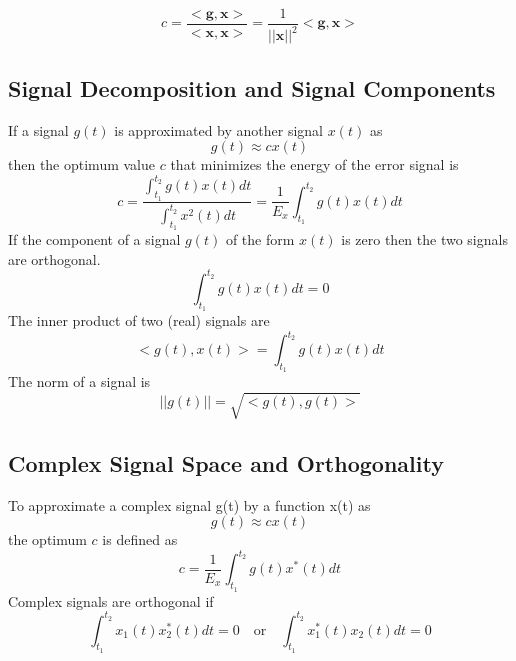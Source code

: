 \documentclass{article}
\begin{document}
    \begin{equation}
        c = \frac{<\textbf{g}, \textbf{x}>}{<\textbf{x}, \textbf{x}>} = \frac{1}{||\textbf{x}||^2}<\textbf{g}, \textbf{x}>
    \end{equation}

    \subsection{Signal Decomposition and Signal Components}
    If a signal $g(t)$ is approximated by another signal $x(t)$ as
    \begin{equation}
        g(t) \approx cx(t)
    \end{equation}
    then the optimum value $c$ that minimizes the energy of the error signal is
    \begin{equation}
        c = \frac{\int_{t_1}^{t_2}g(t)x(t)dt}{\int_{t_1}^{t_2}x^2(t)dt} = \frac{1}{E_x}\int_{t_1}^{t_2}g(t)x(t)dt
    \end{equation}
    If the component of a signal $g(t)$ of the form $x(t)$ is zero then the two signals are orthogonal. 
    \begin{equation}
        \int_{t_1}^{t_2}g(t)x(t)dt = 0
    \end{equation}
    The inner product of two (real) signals are
    \begin{equation}
        <g(t), x(t)> = \int_{t_1}^{t_2}g(t)x(t)dt
    \end{equation}
    The norm of a signal is
    \begin{equation}
        ||g(t)|| = \sqrt{<g(t), g(t)>}
    \end{equation}

    \subsection{Complex Signal Space and Orthogonality}
    To approximate a complex signal g(t) by a function x(t) as 
    \begin{equation}
        g(t) \approx cx(t)
    \end{equation}
    the optimum $c$ is defined as
    \begin{equation}
        c = \frac{1}{E_x}\int_{t_1}^{t_2}g(t)x^\ast(t)dt
    \end{equation}
    Complex signals are orthogonal if
    \begin{equation}
        \int_{t_1}^{t_2}x_1(t)x_2^\ast(t)dt = 0 \quad \textrm{or} \quad \int_{t_1}^{t_2}x_1^\ast(t)x_2(t)dt = 0
    \end{equation}
\end{document}
